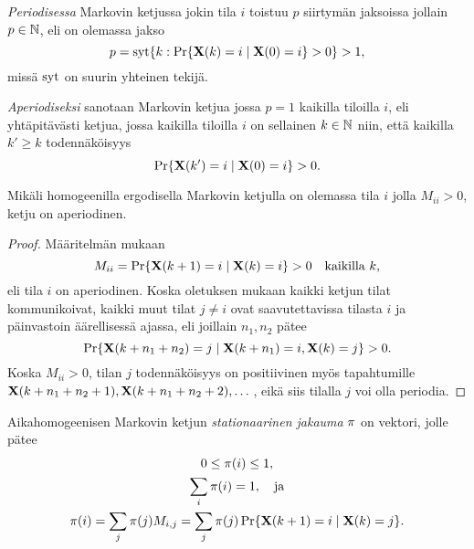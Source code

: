 \begin{maar}
    \emph{Periodisessa} Markovin ketjussa jokin tila $i$ toistuu $p$ siirtymän jaksoissa jollain $p \in \mathbb{N}$, eli on olemassa jakso
    \begin{equation}
        p = \operatorname{syt}\{k : \Pr\{ \mathbf{X}(k) = i \mid \mathbf{X}(0) = i \} > 0\} > 1,
    \end{equation}
    missä $\operatorname{syt}$ on suurin yhteinen tekijä.
\end{maar}

\begin{maar}
    \emph{Aperiodiseksi} sanotaan Markovin ketjua jossa $p = 1$ kaikilla tiloilla $i$,
    eli yhtäpitävästi ketjua, jossa kaikilla tiloilla $i$ on sellainen $k \in \mathbb{N}$ niin, että kaikilla $k' \geq k$ todennäköisyys
    \begin{equation}
        \Pr\{\mathbf{X}(k') = i \mid \mathbf{X}(0) = i\} > 0.
    \end{equation}
\end{maar}

\begin{lause}
    \label{lau:aperiodisuus}
    Mikäli homogeenilla ergodisella Markovin ketjulla on olemassa tila $i$ jolla $M_{ii} > 0$,
    ketju on aperiodinen.
\end{lause}

\begin{proof}
    Määritelmän mukaan
    \begin{equation}
        M_{ii} = \Pr\{\mathbf{X}(k + 1) = i \mid \mathbf{X}(k) = i\} > 0 \quad \text{kaikilla } k,
    \end{equation}
    eli tila $i$ on aperiodinen.
    Koska oletuksen mukaan kaikki ketjun tilat kommunikoivat,
    kaikki muut tilat $j \not = i$ ovat saavutettavissa tilasta $i$ ja päinvastoin äärellisessä ajassa,
    eli joillain $n_1, n_2$ pätee
    \begin{equation}
        \Pr\{\mathbf{X}(k + n_1 + n_2) = j \mid \mathbf{X}(k + n_1) = i, \mathbf{X}(k) = j \} > 0.
    \end{equation}
    Koska $M_{ii} > 0$, tilan $j$ todennäköisyys on positiivinen myös tapahtumille $\mathbf{X}(k + n_1 + n_2 + 1), \mathbf{X}(k + n_1 + n_2 + 2), \dots$,
    eikä siis tilalla $j$ voi olla periodia.
\end{proof}

\begin{maar}
    \label{maar:stationaarinen}
    Aikahomogeenisen Markovin ketjun \emph{stationaarinen jakauma} $\mathbf{\pi}$ on vektori, jolle pätee
    \begin{gather}
        0 \leq \mathbf{\pi}(i) \leq 1, \\
        \sum_i \mathbf{\pi}(i) = 1, \quad \text{ja} \\
            \mathbf{\pi}(i) = \sum_j \mathbf{\pi} (j) M_{i,j} = \sum_j \mathbf{\pi} (j) \Pr\{\mathbf{X}(k+1) = i \mid \mathbf{X}(k) = j\}.
    \end{gather}
\end{maar}

